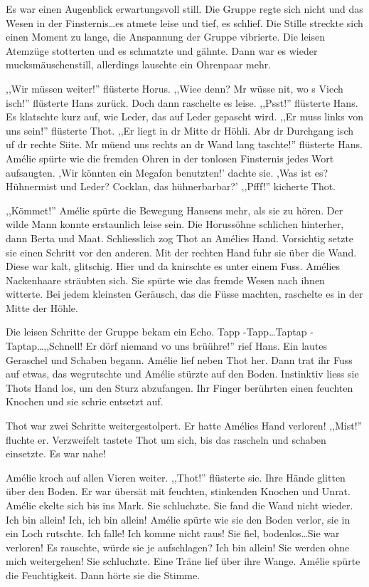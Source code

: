 \documentclass[11pt,titlepage,a5paper]{book}
\begin{document}
Es war einen Augenblick erwartungsvoll still. Die Gruppe regte sich nicht und das Wesen in der Finsternis\dots es atmete leise und tief, es schlief. Die Stille streckte sich einen Moment zu lange, die Anspannung der Gruppe vibrierte. Die leisen Atemzüge stotterten und es schmatzte und gähnte. Dann war es wieder mucksmäuschenstill, allerdings lauschte ein Ohrenpaar mehr.

,,Wir müssen weiter!'' flüsterte Horus. ,,Wiee denn? Mr wüsse nit, wo s Viech isch!'' flüsterte Hans zurück. Doch dann raschelte es leise. ,,Psst!'' flüsterte Hans. Es klatschte kurz auf, wie Leder, das auf Leder gepascht wird. ,,Er muss links von uns sein!'' flüsterte Thot. ,,Er liegt in dr Mitte dr Höhli. Abr dr Durchgang isch uf dr rechte Siite. Mr müend uns rechts an dr Wand lang taschte!'' flüsterte Hans. Amélie spürte wie die fremden Ohren in der tonlosen Finsternis jedes Wort aufsaugten. ,Wir könnten ein Megafon benutzten!' dachte sie. ,Was ist es? Hühnermist und Leder? Cocklan, das hühnerbarbar?' ,,Pfff!'' kicherte Thot.

,,Kömmet!'' Amélie spürte die Bewegung Hansens mehr, als sie zu hören. Der wilde Mann konnte erstaunlich leise sein. Die Horussöhne schlichen hinterher, dann Berta und Maat. Schliesslich zog Thot an Amélies Hand. Vorsichtig setzte sie einen Schritt vor den anderen.  Mit der rechten Hand fuhr sie über die Wand. Diese war kalt, glitschig. Hier und da knirschte es unter einem Fuss. Amélies Nackenhaare sträubten sich. Sie spürte wie das fremde Wesen nach ihnen witterte. Bei jedem kleinsten Geräusch, das die Füsse machten, raschelte es in der Mitte der Höhle.

Die leisen Schritte der Gruppe bekam ein Echo. Tapp -Tapp\dots Taptap -Taptap\dots ,,Schnell! Er dörf niemand vo uns brüühre!'' rief Hans. Ein lautes Geraschel und Schaben begann. Amélie lief neben Thot her. Dann trat ihr Fuss auf etwas, das wegrutschte und Amélie stürzte auf den Boden. Instinktiv liess sie Thots Hand los, um den Sturz abzufangen. Ihr Finger berührten einen feuchten Knochen und sie schrie entsetzt auf. 

Thot war zwei Schritte weitergestolpert. Er hatte Amélies Hand verloren! ,,Mist!'' fluchte er. Verzweifelt tastete Thot um sich, bis das rascheln und schaben einsetzte. Es war nahe!

Amélie kroch auf allen Vieren weiter. ,,Thot!'' flüsterte sie. Ihre Hände glitten über den Boden. Er war übersät mit feuchten, stinkenden Knochen und Unrat. Amélie ekelte sich bis ins Mark. Sie schluchzte. Sie fand die Wand nicht wieder. Ich bin allein! Ich, ich bin allein! Amélie spürte wie sie den Boden verlor, sie in ein Loch rutschte. Ich falle! Ich komme nicht raus! Sie fiel, bodenlos\dots Sie war verloren! Es rauschte, würde sie je aufschlagen? Ich bin allein! Sie werden ohne mich weitergehen! Sie schluchzte. Eine Träne lief über ihre Wange. Amélie spürte die Feuchtigkeit. Dann hörte sie die Stimme.
\end{document}
